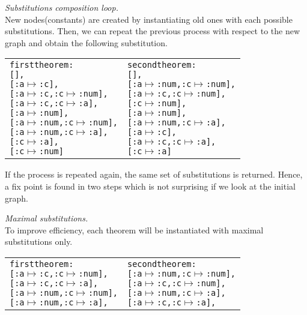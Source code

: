\documentclass[a4paper, 11pt]{article}
\theoremstyle{plain}
\theoremstyle{definition}
\theoremstyle{remark}
\begin{document}
\vspace{5mm}
\noindent \textit{Substitutions composition loop.}
\\New nodes(constants) are created by instantiating old ones with each possible substitutions. Then, we can repeat the previous process with respect to the new graph and obtain the following substitution. 

\begin{tabularx}{\textwidth}{ X X }
\begin{alltt}
first theorem :
  [],
  [{:a\(\mapsto\):c}],
  [{:a\(\mapsto\):c},{:c\(\mapsto\):num}],
  [{:a\(\mapsto\):c},{:c\(\mapsto\):a}],
  [{:a\(\mapsto\):num}],
  [{:a\(\mapsto\):num},{:c\(\mapsto\):num}],
  [{:a\(\mapsto\):num},{:c\(\mapsto\):a}],
  [{:c\(\mapsto\):a}], 
  [{:c\(\mapsto\):num}]
\end{alltt}
 & 
\begin{alltt}
second theorem :  
  [],
  [{:a\(\mapsto\):num},{:c\(\mapsto\):num}],
  [{:a\(\mapsto\):c}, {:c\(\mapsto\):num}],
  [{:c\(\mapsto\):num}],
  [{:a\(\mapsto\):num}],
  [{:a\(\mapsto\):num},{:c\(\mapsto\):a}],
  [{:a\(\mapsto\):c}],
  [{:a\(\mapsto\):c}, {:c\(\mapsto\):a}],
  [{:c\(\mapsto\):a}] 
\end{alltt}
 \\
\end{tabularx}
If the process is repeated again, the same set of substitutions is returned. Hence, a fix point is found in two steps which is not surprising if we look at the initial graph.

\vspace{5mm}
\noindent \textit{Maximal substitutions.}
\\To improve efficiency, each theorem will be instantiated with maximal substitutions only.

\begin{tabularx}{\textwidth}{ X X }
\begin{alltt}
first theorem :
  [{:a\(\mapsto\):c},{:c\(\mapsto\):num}],
  [{:a\(\mapsto\):c},{:c\(\mapsto\):a}],
  [{:a\(\mapsto\):num},{:c\(\mapsto\):num}],
  [{:a\(\mapsto\):num},{:c\(\mapsto\):a}],
\end{alltt}
 & 
\begin{alltt}
second theorem :  
  [{:a\(\mapsto\):num},{:c\(\mapsto\):num}],
  [{:a\(\mapsto\):c}, {:c\(\mapsto\):num}],
  [{:a\(\mapsto\):num},{:c\(\mapsto\):a}],
  [{:a\(\mapsto\):c}, {:c\(\mapsto\):a}],
\end{alltt}
 \\
\end{tabularx}
\end{document}
